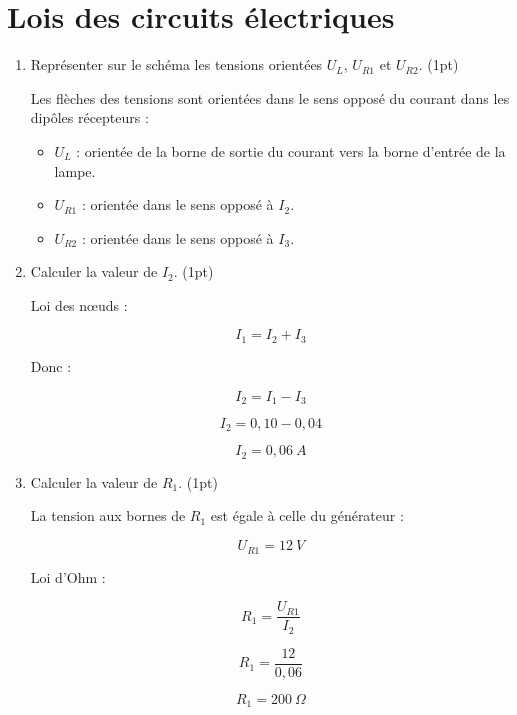 \documentclass[a4paper,11pt,fleqn]{scrartcl}
\begin{document}
    \section{Lois des circuits électriques}

    \begin{enumerate}
        \item Représenter sur le schéma les tensions orientées $U_L$, $U_{R1}$ et $U_{R2}$. (1pt)
        
        Les flèches des tensions sont orientées dans le sens opposé du courant dans les dipôles récepteurs :
        
        \begin{itemize}
            \item $U_L$ : orientée de la borne de sortie du courant vers la borne d’entrée de la lampe.
            \item $U_{R1}$ : orientée dans le sens opposé à $I_2$.
            \item $U_{R2}$ : orientée dans le sens opposé à $I_3$.
        \end{itemize}

        \item Calculer la valeur de $I_2$. (1pt)
        
        Loi des nœuds :
        
        \[
        I_1 = I_2 + I_3
        \]
        
        Donc :
        
        \[
        I_2 = I_1 - I_3
        \]
        
        \[
        I_2 = 0{,}10 - 0{,}04
        \]
        
        \[
        I_2 = 0{,}06~A
        \]

        \item Calculer la valeur de $R_1$. (1pt)
        
        La tension aux bornes de $R_1$ est égale à celle du générateur :
        
        \[
        U_{R1} = 12~V
        \]
        
        Loi d’Ohm :
        
        \[
        R_1 = \frac{U_{R1}}{I_2}
        \]
        
        \[
        R_1 = \frac{12}{0{,}06}
        \]
        
        \[
        R_1 = 200~\Omega
        \]
        
    \end{enumerate}
\end{document}
